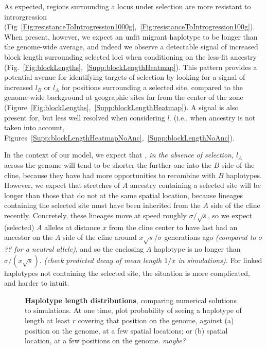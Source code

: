 \documentclass[11pt,letterpaper]{article}
\newcommand{\alisa}[1]{{\em \color{red} #1}}
\newcommand{\plr}[1]{{\em \color{blue} #1}}
\begin{document}
As expected, regions surrounding a locus under selection are more resistant to introrgression (Fig~\ref{Fig:resistanceToIntrogression1000g},~\ref{Fig:resistanceToIntrogression100g}).  When present, however, we expect an unfit migrant haplotype to be longer than the genome-wide average, and indeed we observe a detectable signal of increased block length surrounding selected loci when conditioning on the less-fit ancestry (Fig.~\ref{Fig:blockLengths},~\ref{Supp:blockLengthHeatmap}). This pattern provides a potential avenue for identifying targets of selection by looking for a signal of increased $l_B$ or $l_A$ for positions surrounding a selected site, compared to the genome-wide background  at geographic sites far from the center of the zone (Figure~\ref{Fig:blockLengths},~\ref{Supp:blockLengthHeatmap}). A signal is also present for, but less well resolved when considering $l_\cdot$ (i.e., when ancestry is not taken into account, Figures~\ref{Supp:blockLengthHeatmapNoAnc},~\ref{Supp:blockLengthNoAnc}).


In the context of our model, we expect that\alisa{, in the absence of selection,} $l_A$ across the genome will tend to be shorter the further one into the $B$ side of the cline,
because they have had more opportunities to recombine with $B$ haplotypes. 
However, we expect that stretches of $A$ ancestry containing a selected site will be longer
than those that do not at the same spatial location,
because lineages containing the selected site must have been inherited from the $A$ side of the cline recently. 
Concretely, these lineages move at speed roughly $\sigma/\sqrt{s}$,
so we expect (selected) $A$ alleles at distance $x$ from the cline center
to have last had an ancestor on the $A$ side of the cline around $x \sqrt{s}/\sigma$ generations ago \alisa{(compared to $\sigma$?? for a neutral allele)},
and so the enclosing $A$ haplotype is no longer than $\sigma/(x \sqrt{s})$.
\plr{(check predicted decay of mean length $1/x$ in simulations).}
For linked haplotypes not containing the selected site, the situation is more complicated, and harder to intuit.


\begin{figure}
    \begin{center}
    \end{center}
    \caption{
        \textbf{Haplotype length distributions},
        comparing numerical solutions to simulations.
        At one time, plot 
        probability of seeing a haplotype of length at least $r$ covering that position on the genome,
        against (a) position on the genome, at a few spatial locations;
        or (b) spatial location, at a few positions on the genome.
        \plr{maybe?}
        \label{fig:haplotype_lengths}
    }
\end{figure}
\end{document}
